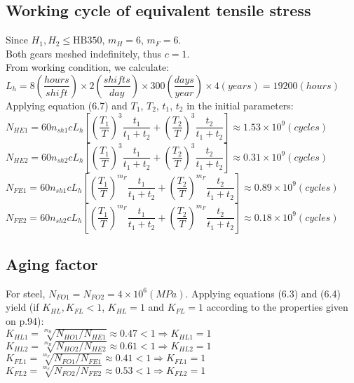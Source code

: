 \subsection{Working cycle of equivalent tensile stress}
Since $ H_1,H_2\leq\text{HB}350 $, $ m_H=6 $, $ m_F=6 $.\\
Both gears meshed indefinitely, thus $ c=1 $.\\
From working condition, we calculate:\\
$ L_h = 8\unit{\left( \dfrac{hours}{shift}\right)}\times2\unit{\left( \dfrac{shifts}{day}\right) }\times300\unit{\left( \dfrac{days}{year}\right)}\times4\unit{(years)}=19200\unit{(hours)}$\\
Applying equation (6.7)  and $ T_1 $, $ T_2 $, $ t_1 $, $ t_2 $ in the initial parameters:\\
$ N_{HE1} = 60n_{sh1}cL_h\left[ \left( \dfrac{T_1}{T}\right)^3\dfrac{t_1}{t_1+t_2} + \left( \dfrac{T_2}{T}\right)^3\dfrac{t_2}{t_1+t_2}\right] \approx 1.53\times10^9\unit{(cycles)}$\\
$ N_{HE2} = 60n_{sh2}cL_h\left[ \left( \dfrac{T_1}{T}\right)^3\dfrac{t_1}{t_1+t_2} + \left( \dfrac{T_2}{T}\right)^3\dfrac{t_2}{t_1+t_2}\right] \approx 0.31\times10^9\unit{(cycles)}$\\
$ N_{FE1} = 60n_{sh1}cL_h\left[ \left( \dfrac{T_1}{T}\right)^{m_F}\dfrac{t_1}{t_1+t_2} + \left( \dfrac{T_2}{T}\right)^{m_F}\dfrac{t_2}{t_1+t_2}\right] \approx 0.89\times10^9\unit{(cycles)}$\\
$ N_{FE2} = 60n_{sh2}cL_h\left[ \left( \dfrac{T_1}{T}\right)^{m_F}\dfrac{t_1}{t_1+t_2} + \left( \dfrac{T_2}{T}\right)^{m_F}\dfrac{t_2}{t_1+t_2}\right] \approx 0.18\times10^9\unit{(cycles)}$

\subsection{Aging factor}
For steel, $ N_{FO1} = N_{FO2} = 4\times10^6\unit{(MPa)}$. Applying equations (6.3) and (6.4)  yield (if $ K_{HL}, K_{FL} < 1 $, $ K_{HL} = 1$ and $ K_{FL} = 1$ according to the properties given on p.94):\\
$K_{HL1} = \sqrt[m_H]{N_{HO1}/N_{HE1}} \approx 0.47 < 1 \Rightarrow K_{HL1} = 1$\\
$ K_{HL2} = \sqrt[m_H]{N_{HO2}/N_{HE2}} \approx 0.61 < 1 \Rightarrow K_{HL2} = 1$\\
$ K_{FL1} = \sqrt[m_F]{N_{FO1}/N_{FE1}} \approx 0.41 < 1 \Rightarrow K_{FL1} = 1$\\
$ K_{FL2} = \sqrt[m_F]{N_{FO2}/N_{FE2}} \approx 0.53 < 1 \Rightarrow K_{FL2} = 1$

